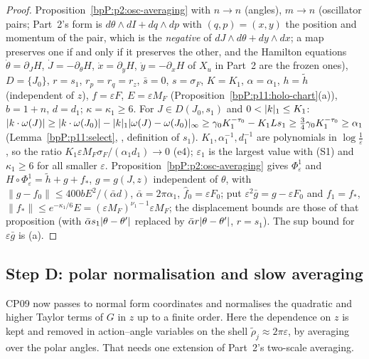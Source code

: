 \begin{proof}
\label{stepP:p11:af-apply} Proposition~\ref{bpP:p2:osc-averaging} with $n\to n$ (angles), $m\to n$ (oscillator pairs; Part~2's form is $d\theta\wedge dI+dq\wedge dp$ with $(q,p)=(x,y)$ the position and momentum of the pair, which is the \emph{negative} of $dJ\wedge d\theta+dy\wedge dx$; a map preserves one if and only if it preserves the other, and the Hamilton equations $\dot\theta=\partial_JH$, $\dot J=-\partial_\theta H$, $\dot x=\partial_yH$, $\dot y=-\partial_xH$ of $X_u$ in Part~2 are the frozen ones), $D=\{J_0\}$, $r=s_1$, $r_p=r_q=r_z$, $\bar s=0$, $s=\sigma_F$, $K=K_1$, $\alpha=\alpha_1$, $h=\tilde h$ (independent of $z$), $f=\varepsilon F$, $E=\varepsilon M_F$ (Proposition~\ref{bpP:p11:holo-chart}(a)), $b=1+n$, $d=d_1$; $\kappa=\kappa_1\ge6$.
\label{stepP:p11:af-o1} For $J\in D(J_0,s_1)$ and $0<\lvert k\rvert_1\le K_1$: $\lvert k\cdot\omega(J)\rvert\ge\lvert k\cdot\omega(J_0)\rvert-\lvert k\rvert_1\lvert \omega(J)-\omega(J_0)\rvert_\infty\ge\gamma_0K_1^{-\tau_0}-K_1Ls_1\ge\tfrac34\gamma_0K_1^{-\tau_0}\ge\alpha_1$ (Lemma~\ref{bpP:p11:select}, , definition of $s_1$).
\label{stepP:p11:af-o2} $K_1,\alpha_1^{-1},d_1^{-1}$ are polynomials in $\log\frac1\varepsilon$, so the ratio $K_1\varepsilon M_F\sigma_F/(\alpha_1d_1)\to0$ (e4); $\varepsilon_1$ is the largest value with (S1) and $\kappa_1\ge6$ for all smaller $\varepsilon$.
\label{stepP:p11:af-concl} Proposition~\ref{bpP:p2:osc-averaging} gives $\Phi^1_\varepsilon$ and $H\circ\Phi^1_\varepsilon=\tilde h+g+f_*$, $g=g(J,z)$ independent of $\theta$, with $\lVert g-\hat f_0\rVert\le400bE^2/(\bar\alpha d)$, $\bar\alpha=2\pi\alpha_1$, $\hat f_0=\varepsilon F_0$; put $\varepsilon^2\bar g=g-\varepsilon F_0$ and $f_1=f_*$, $\lVert f_*\rVert\le e^{-\kappa_1/6}E=(\varepsilon M_F)^{\nu_1-1}\varepsilon M_F$; the displacement bounds are those of that proposition (with $\bar\alpha s_1\lvert \theta-\theta'\rvert$ replaced by $\bar\alpha r\lvert \theta-\theta'\rvert$, $r=s_1$). The sup bound for $\varepsilon\bar g$ is (a).
\end{proof}

\subsection{Step D: polar normalisation and slow averaging}\label{bpP:p11:sec-D}

CP09 now passes to normal form coordinates and normalises the quadratic and higher Taylor terms of $G$ in $z$ up to a finite order. Here the dependence on $z$ is kept and removed in action--angle variables on the shell $\tilde\rho_j\approx2\pi\varepsilon$, by averaging over the polar angles. That needs one extension of Part~2's two-scale averaging.

